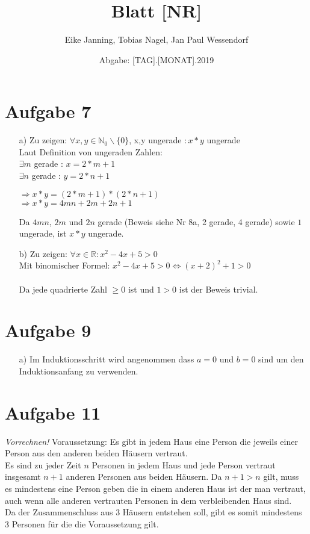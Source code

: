 \documentclass[paper = a4, ngerman]{scrartcl}
\title{Blatt [NR]}
\author{Eike Janning, Tobias Nagel, Jan Paul Wessendorf}
\date{Abgabe: [TAG].[MONAT].2019}
\begin{document}
	\maketitle
	\hrulefill
	
	\section*{Aufgabe 7}
		\begin{itemize}
			\item[a)] Zu zeigen: $\forall x,y \in \mathbb{N}_0 \backslash \{ 0 \}$, x,y ungerade $: x*y$ ungerade\\
			Laut Definition von ungeraden Zahlen:\\
			$\exists m$ gerade : $x = 2*m+1$\\
			$\exists n$ gerade : $y = 2*n+1$
			\begin{center}
				$\Rightarrow x*y = (2*m+1)*(2*n+1)$\\
				$\Rightarrow x*y = 4mn + 2m + 2n + 1$
			\end{center}
			Da $4mn$, $2m$ und $2n$ gerade (Beweis siehe Nr 8a, 2 gerade, 4 gerade) sowie $1$ ungerade, ist $x*y$ ungerade.
			
			\item[b)] Zu zeigen: $\forall x \in \mathbb{R} : x^2 - 4x + 5 > 0$\\
			Mit binomischer Formel: $x^2 - 4x + 5 > 0 \Leftrightarrow (x + 2)^2 + 1 > 0$\\\\
			Da jede quadrierte Zahl $\ge 0$ ist und $1 > 0$ ist der Beweis trivial.
		\end{itemize}
	
	
	\section*{Aufgabe 9}
		\begin{itemize}
			\item[a)] Im Induktionsschritt wird angenommen dass $a=0$ und $b=0$ sind um den Induktionsanfang zu verwenden.
		\end{itemize}
	

\pagebreak
	\section*{Aufgabe 11}
		\textit{Vorrechnen!}
		Voraussetzung: Es gibt in jedem Haus eine Person die jeweils einer Person aus den anderen beiden Häusern vertraut.\\
		Es sind zu jeder Zeit $n$ Personen in jedem Haus und jede Person vertraut insgesamt $n+1$ anderen Personen aus beiden Häusern. Da $n+1 > n$ gilt, muss es mindestens eine Person geben die in einem anderen Haus ist der man vertraut, auch wenn alle anderen vertrauten Personen in dem verbleibenden Haus sind.\\
		Da der Zusammenschluss aus 3 Häusern entstehen soll, gibt es somit mindestens 3 Personen für die die Voraussetzung gilt.
\end{document}
